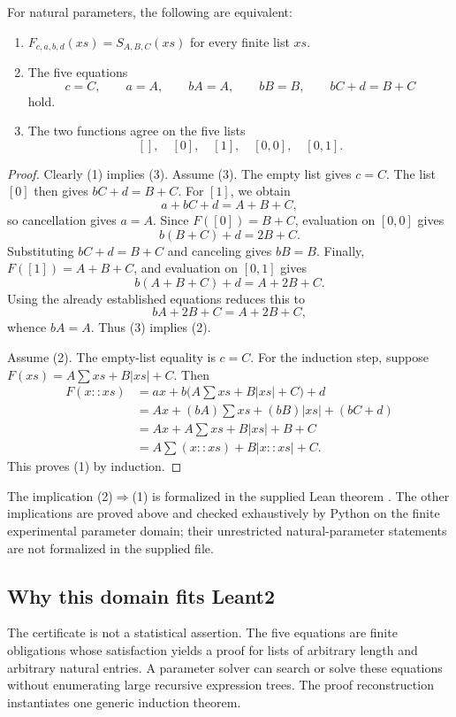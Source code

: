 \begin{theorem}
\label{thm:affine}
For natural parameters, the following are equivalent:
\begin{enumerate}
\item $F_{c,a,b,d}(xs)=S_{A,B,C}(xs)$ for every finite list $xs$.
\item The five equations
\begin{equation}
\label{eq:affine}
 c=C,\qquad a=A,\qquad bA=A,\qquad bB=B,\qquad bC+d=B+C
\end{equation}
hold.
\item The two functions agree on the five lists
\[
 [],\quad [0],\quad [1],\quad [0,0],\quad [0,1].
\]
\end{enumerate}
\end{theorem}
\begin{proof}
Clearly (1) implies (3). Assume (3). The empty list gives $c=C$. The list $[0]$ then gives $bC+d=B+C$. For $[1]$, we obtain
\[
 a+bC+d=A+B+C,
\]
so cancellation gives $a=A$. Since $F([0])=B+C$, evaluation on $[0,0]$ gives
\[
 b(B+C)+d=2B+C.
\]
Substituting $bC+d=B+C$ and canceling gives $bB=B$. Finally, $F([1])=A+B+C$, and evaluation on $[0,1]$ gives
\[
 b(A+B+C)+d=A+2B+C.
\]
Using the already established equations reduces this to
\[
 bA+2B+C=A+2B+C,
\]
whence $bA=A$. Thus (3) implies (2).

Assume (2). The empty-list equality is $c=C$. For the induction step, suppose $F(xs)=A\sum xs+B|xs|+C$. Then
\begin{align*}
 F(x::xs)
 &=a x+b\bigl(A\sum xs+B|xs|+C\bigr)+d\\
 &=A x+(bA)\sum xs+(bB)|xs|+(bC+d)\\
 &=A x+A\sum xs+B|xs|+B+C\\
 &=A\sum(x::xs)+B|x::xs|+C.
\end{align*}
This proves (1) by induction.
\end{proof}
The implication (2)$\Rightarrow$(1) is formalized in the supplied Lean theorem . The other implications are proved above and checked exhaustively by Python on the finite experimental parameter domain; their unrestricted natural-parameter statements are not formalized in the supplied file.

\subsection{Why this domain fits Leant2}
The certificate is not a statistical assertion. The five equations are finite obligations whose satisfaction yields a proof for lists of arbitrary length and arbitrary natural entries. A parameter solver can search or solve these equations without enumerating large recursive expression trees. The proof reconstruction instantiates one generic induction theorem.

